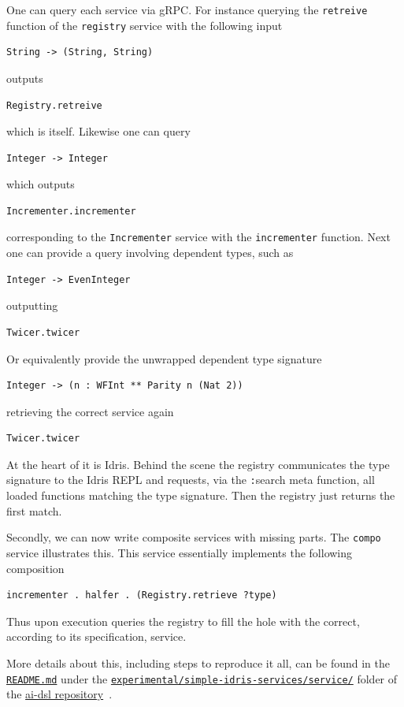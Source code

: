 \documentclass[]{report}
\begin{document}
One can query each service via gRPC.  For instance querying the
\texttt{retreive} function of the \texttt{registry} service with the
following input
\begin{verbatim}
String -> (String, String)
\end{verbatim}
outputs
\begin{verbatim}
Registry.retreive
\end{verbatim}
which is itself.  Likewise one can query
\begin{verbatim}
Integer -> Integer
\end{verbatim}
which outputs
\begin{verbatim}
Incrementer.incrementer
\end{verbatim}
corresponding to the \texttt{Incrementer} service with the
\texttt{incrementer} function.
Next one can provide a query involving dependent types, such as
\begin{verbatim}
Integer -> EvenInteger
\end{verbatim}
outputting
\begin{verbatim}
Twicer.twicer
\end{verbatim}
Or equivalently provide the unwrapped dependent type signature
\begin{verbatim}
Integer -> (n : WFInt ** Parity n (Nat 2))
\end{verbatim}
retrieving the correct service again
\begin{verbatim}
Twicer.twicer
\end{verbatim}

At the heart of it is Idris.  Behind the scene the registry
communicates the type signature to the Idris REPL and requests, via
the {\texttt :search} meta function, all loaded functions matching the
type signature.  Then the registry just returns the first match.

Secondly, we can now write composite services with missing parts.  The
\texttt{compo} service illustrates this.  This service essentially
implements the following composition
\begin{verbatim}
incrementer . halfer . (Registry.retrieve ?type)
\end{verbatim}
Thus upon execution queries the registry to fill the hole with the
correct, according to its specification, service.

More details about this, including steps to reproduce it all, can be
found in the
\href{https://github.com/singnet/ai-dsl/blob/master/experimental/registry-dsl/README.md}{\texttt{README.md}}
under the
\href{https://github.com/singnet/ai-dsl/blob/master/experimental/registry-dsl/}{\texttt{experimental/simple-idris-services/service/}}
folder of the \href{https://github.com/singnet/ai-dsl/}{ai-dsl
  repository}~\cite{AIDSLRepo}.
\end{document}

